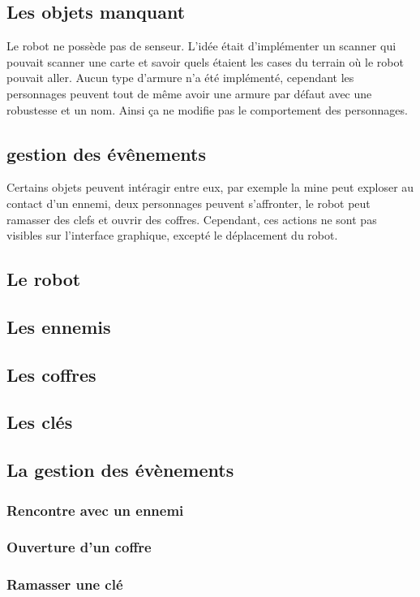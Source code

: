 \documentclass[a4paper 12pts]{article}
\begin{document}
\subsection{Les objets manquant}
Le robot ne possède pas de senseur. L'idée était d'implémenter un scanner qui pouvait scanner une carte et savoir quels étaient les cases du terrain où le robot pouvait aller. Aucun type d'armure n'a été implémenté, cependant les personnages peuvent tout de même avoir une armure par défaut avec une robustesse et un nom. Ainsi ça ne modifie pas le comportement des personnages.

\subsection{gestion des évênements}
Certains objets peuvent intéragir entre eux, par exemple la mine peut exploser au contact d'un ennemi, deux personnages peuvent s'affronter, le robot peut ramasser des clefs et ouvrir des coffres. Cependant, ces actions ne sont pas visibles sur l'interface graphique, excepté le déplacement du robot.

\subsection{Le robot}
\subsection{Les ennemis}
\subsection{Les coffres}
\subsection{Les clés}
\subsection{La gestion des évènements}
\subsubsection {Rencontre avec un ennemi} 
\subsubsection {Ouverture d'un coffre}
\subsubsection {Ramasser une clé}
\end{document}
